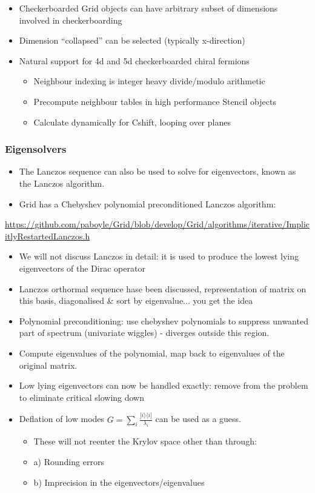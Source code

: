 \documentclass[pdf,ps,8pt]{beamer}
\newcommand{\link}[1]{\href{#1}{ {\color{blue} #1} }}
\begin{document}
\begin{frame}[fragile]
\begin{center}
\end{center}
\begin{itemize}
\item Checkerboarded Grid objects can have arbitrary subset of dimensions involved in checkerboarding
\item Dimension ``collapsed'' can be selected (typically x-direction)
\item Natural support for 4d and 5d checkerboarded chiral fermions  
\begin{itemize}
  \item Neighbour indexing is integer heavy divide/modulo arithmetic
  \item Precompute neighbour tables in high performance Stencil objects
  \item Calculate dynamically for Cshift, looping over planes
\end{itemize}
\end{itemize}
\end{frame}

  \begin{frame}[fragile]\small\frametitle{ Eigensolvers}
\begin{itemize}
\item   The Lanczos sequence can also be used to solve for eigenvectors, known as the Lanczos algorithm.
\item   Grid has a Chebyshev polynomial preconditioned Lanczos algorithm:
\end{itemize}
\link{https://github.com/paboyle/Grid/blob/develop/Grid/algorithms/iterative/ImplicitlyRestartedLanczos.h}
\begin{itemize}
\item We will not discuss Lanczos in detail: it is used to produce the lowest lying eigenvectors of the Dirac operator
\item Lanczos orthormal sequence hase been discussed, representation of matrix on this basis, diagonalised \& sort by eigenvalue... you get the idea
\item Polynomial preconditioning: use chebyshev polynomials to suppress unwanted part of spectrum (univariate wiggles) - diverges outside this region.
\item Compute eigenvalues of the polynomial, map back to eigenvalues of the original matrix.
\item Low lying eigenvectors can now be handled exactly: remove from the problem to eliminate critical slowing down
\item Deflation of low modes $G = \sum_i  \frac{|i\rangle\langle i|}{\lambda_i}  $ can be used as a guess.\\
\begin{itemize}
\item      These will not reenter the Krylov space other than through:
\item a) Rounding errors
\item b) Imprecision in the eigenvectors/eigenvalues
\end{itemize}
\end{itemize}
  \end{frame}
\end{document}

